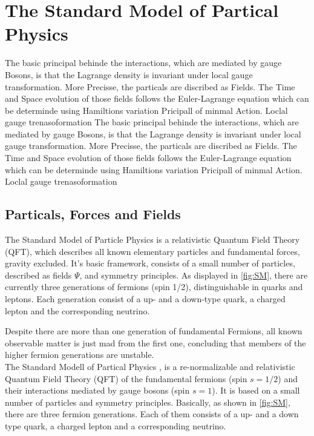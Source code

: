 \chapter{The Standard Model of Partical Physics}
\label{sec:SM}
The basic principal behinde the interactions, which are mediated by gauge Bosons, is  that the Lagrange density is invariant under local gauge transformation. More Precisse, the particals are discribed as Fields. The Time and Space evolution of those fields follows the Euler-Lagrange equation which can be determinde using Hamiltions variation Pricipall of minmal Action. 
Loclal gauge trenasoformation
The basic principal behinde the interactions, which are mediated by gauge Bosons, is  that the Lagrange density is invariant under local gauge transformation. More Precisse, the particals are discribed as Fields. The Time and Space evolution of those fields follows the Euler-Lagrange equation which can be determinde using Hamiltions variation Pricipall of minmal Action. 
Loclal gauge trenasoformation




\section{Particals, Forces and Fields}\label{key:SM 2}


The Standard Model of Particle Physics \cite{glashow1961partial,glashow1970weak,gross1973asymptotically,politzer1973reliable,politzer1974asymptotic,salam1964electromagnetic,weinberg1967model} is a relativistic Quantum Field Theory (QFT), which describes all known elementary particles and fundamental forces, gravity excluded.  It's basic framework, consists of a small number of particles, described as fields $\Psi$, and symmetry principles. As displayed in \cref{fig:SM}, there are currently three generations of fermions (spin 1/2), distinguishable in quarks and leptons. Each generation consist of a up- and a down-type quark, a charged lepton and the corresponding neutrino. 



Despite there are more than one generation of fundamental Fermions, all known observable matter is just mad from the first one, concluding that members of the higher fermion generations are unstable. 
\\

The Standard Modell of Partical Physics , is a re-normalizable and relativistic Quantum Field Theory (QFT) of the fundamental fermions (spin $s =1/2$) and their interactions mediated by gauge bosons (spin $s = 1$).  It is based on a small number of particles and symmetry principles. Basically, as shown in \cref{fig:SM}, there are three fermion generations. Each of them consists of  a up- and a down type quark, a charged lepton and a corresponding neutrino. \\ 

